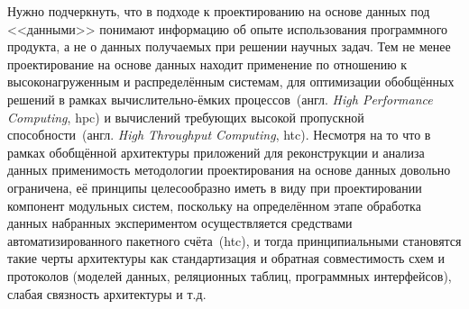 Нужно подчеркнуть, что в подходе к проектированию на основе данных
под <<данными>> понимают информацию об опыте использования
программного продукта, а не о данных получаемых
при решении научных задач. Тем не менее проектирование на основе
данных находит применение по отношению к высоконагруженным и распределённым
системам, для оптимизации обобщённых
решений в рамках вычислительно-ёмких
процессов~(англ. \emph{High Performance Computing}, \acrshort{hpc})
и вычислений требующих высокой пропускной
способности~(англ. \emph{High Throughput Computing}, \acrshort{htc}).
Несмотря на то что в рамках обобщённой архитектуры приложений для
реконструкции и анализа данных применимость методологии проектирования
на основе данных довольно ограничена, её принципы целесообразно иметь
в виду при проектировании
компонент модульных систем, поскольку на определённом этапе обработка
данных набранных экспериментом осуществляется средствами автоматизированного
пакетного счёта~(\acrshort{htc}), и тогда принципиальными становятся такие черты
архитектуры как стандартизация и обратная совместимость схем и протоколов
(моделей данных, реляционных таблиц, программных интерфейсов),
слабая связность архитектуры и т.д.

